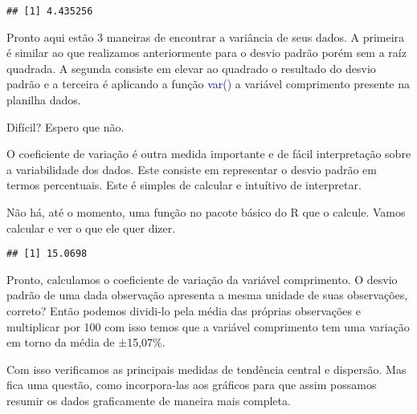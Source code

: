 \documentclass[titlepage, oneside, openany, a4paper]{book}
\newenvironment{Shaded}{\begin{snugshade}}{\end{snugshade}}
\newcommand{\DecValTok}[1]{\textcolor[rgb]{0.00,0.00,0.81}{#1}}
\newcommand{\KeywordTok}[1]{\textcolor[rgb]{0.13,0.29,0.53}{\textbf{#1}}}
\newcommand{\NormalTok}[1]{#1}
\newcommand{\OperatorTok}[1]{\textcolor[rgb]{0.81,0.36,0.00}{\textbf{#1}}}
\begin{document}
\begin{Shaded}
\end{Shaded}

\begin{verbatim}
## [1] 4.435256
\end{verbatim}

Pronto aqui estão 3 maneiras de encontrar a variância de seus dados. A primeira é similar ao que realizamos anteriormente para o desvio padrão porém sem a raíz quadrada. A segunda consiste em elevar ao quadrado o resultado do desvio padrão e a terceira é aplicando a função \textcolor{blue}{var()} a variável comprimento presente na planilha dados.

Difícil? Espero que não.

O coeficiente de variação é outra medida importante e de fácil interpretação sobre a variabilidade dos dados. Este consiste em representar o desvio padrão em termos percentuais. Este é simples de calcular e intuítivo de interpretar.

Não há, até o momento, uma função no pacote básico do R que o calcule. Vamos calcular e ver o que ele quer dizer.

\begin{Shaded}
\end{Shaded}

\begin{verbatim}
## [1] 15.0698
\end{verbatim}

Pronto, calculamos o coeficiente de variação da variável comprimento. O desvio padrão de uma dada observação apresenta a mesma unidade de suas observações, correto? Então podemos dividi-lo pela média das próprias observações e multiplicar por 100 com isso temos que a variável comprimento tem uma variação em torno da média de ±15,07\%.

Com isso verificamos as principais medidas de tendência central e dispersão. Mas fica uma questão, como incorpora-las aos gráficos para que assim possamos resumir os dados graficamente de maneira mais completa.
\end{document}
